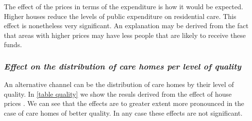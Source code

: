 \documentclass[12pt,letterpaper]{article}
\begin{document}
The effect of the prices in terms of the expenditure is how it would be 
expected. Higher houses reduce the levels of public expenditure on residential care.  
This effect is nonetheless very significant. An explanation may be derived from 
the fact that areas with higher prices may have less people that are likely to 
receive these funds. 



\subsubsection*{\normalsize{\it Effect on the distribution of care homes per level of quality}}

An alternative channel can be the distribution of care homes by their level of 
quality. In \ref{table quality} we show the resuls derived from the effect of house 
prices . We can see that the effects are to greater extent more pronounced in the case of care 
homes of better quality. In any case these effects are not significant.
\end{document}
